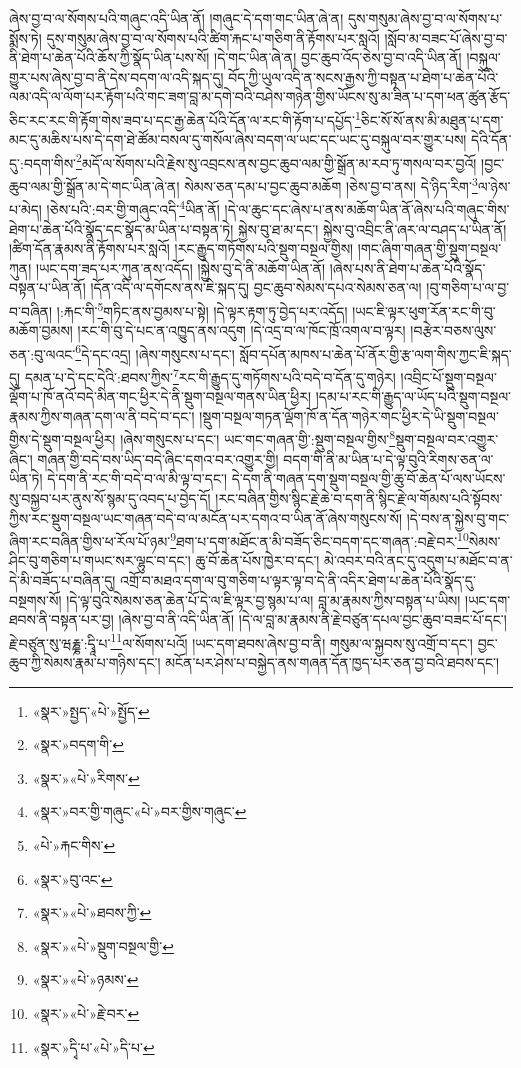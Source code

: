 ཞེས་བྱ་བ་ལ་སོགས་པའི་གཞུང་འདི་ཡིན་ནོ། །གཞུང་དེ་དག་གང་ཡིན་ཞེ་ན། དུས་གསུམ་ཞེས་བྱ་བ་ལ་སོགས་པ་སྨོས་ཏེ། དུས་གསུམ་ཞེས་བྱ་བ་ལ་སོགས་པའི་ཚིག་རྐང་པ་གཅིག་ནི་རྟོགས་པར་སླའོ། །སློབ་མ་བཟང་པོ་ཞེས་བྱ་བ་ནི་ཐེག་པ་ཆེན་པོའི་ཆོས་ཀྱི་སྣོད་ཡིན་པས་སོ། །དེ་གང་ཡིན་ཞེ་ན། བྱང་ཆུབ་འོད་ཅེས་བྱ་བ་འདི་ཡིན་ནོ། །བསྐུལ་གྱུར་པས་ཞེས་བྱ་བ་ནི་དེས་བདག་ལ་འདི་སྐད་དུ། བོད་ཀྱི་ཡུལ་འདི་ན་སངས་རྒྱས་ཀྱི་བསྟན་པ་ཐེག་པ་ཆེན་པོའི་ལམ་འདི་ལ་ལོག་པར་རྟོག་པའི་གང་ཟག་བླ་མ་དགེ་བའི་བཤེས་གཉེན་གྱིས་ཡོངས་སུ་མ་ཟིན་པ་དག་ཕན་ཚུན་རྩོད་ཅིང་རང་རང་གི་རྟོག་གེས་ཟབ་པ་དང་རྒྱ་ཆེན་པོའི་དོན་ལ་རང་གི་རྟོག་པ་དཔྱོད་\footnote{«སྣར་»སྤྱད་«པེ་»སྤྱོད་}ཅིང་སོ་སོ་ནས་མི་མཐུན་པ་དག་མང་དུ་མཆིས་པས་དེ་དག་ཐེ་ཚོམ་བསལ་དུ་གསོལ་ཞེས་བདག་ལ་ཡང་དང་ཡང་དུ་བསྐུལ་བར་གྱུར་པས། དེའི་དོན་དུ་:བདག་གིས་\footnote{«སྣར་»བདག་གི་}མདོ་ལ་སོགས་པའི་རྗེས་སུ་འབྲངས་ནས་བྱང་ཆུབ་ལམ་གྱི་སྒྲོན་མ་རབ་ཏུ་གསལ་བར་བྱའོ། །བྱང་ཆུབ་ལམ་གྱི་སྒྲོན་མ་དེ་གང་ཡིན་ཞེ་ན། སེམས་ཅན་དམ་པ་བྱང་ཆུབ་མཆོག །ཅེས་བྱ་བ་ནས། དེ་ཉིད་རིག་\footnote{«སྣར་»«པེ་»རིགས་}ལ་ཉེས་པ་མེད། །ཅེས་པའི་:བར་གྱི་གཞུང་འདི་\footnote{«སྣར་»བར་གྱི་གཞུང་«པེ་»བར་གྱིས་གཞུང་}ཡིན་ནོ། །དེ་ལ་ཆུང་དང་ཞེས་པ་ནས་མཆོག་ཡིན་ནོ་ཞེས་པའི་གཞུང་གིས་ཐེག་པ་ཆེན་པོའི་སྣོད་དང་སྣོད་མ་ཡིན་པ་བསྟན་ཏེ། སྐྱེས་བུ་ཐ་མ་དང་། སྐྱེས་བུ་འབྲིང་ནི་ཞར་ལ་བཤད་པ་ཡིན་ནོ། །ཚིག་དོན་རྣམས་ནི་རྟོགས་པར་སླའོ། །རང་རྒྱུད་གཏོགས་པའི་སྡུག་བསྔལ་གྱིས། །གང་ཞིག་གཞན་གྱི་སྡུག་བསྔལ་ཀུན། །ཡང་དག་ཟད་པར་ཀུན་ནས་འདོད། །སྐྱེས་བུ་དེ་ནི་མཆོག་ཡིན་ནོ། །ཞེས་པས་ནི་ཐེག་པ་ཆེན་པོའི་སྣོད་བསྟན་པ་ཡིན་ནོ། །དོན་འདི་ལ་དགོངས་ནས་ཇི་སྐད་དུ། བྱང་ཆུབ་སེམས་དཔའ་སེམས་ཅན་ལ། །བུ་གཅིག་པ་ལ་བྱ་བ་བཞིན། །:རྐང་གི་\footnote{«པེ་»རྐང་གིས་}གཏིང་ནས་བྱམས་པ་སྟེ། །དེ་ལྟར་རྟག་ཏུ་བྱེད་པར་འདོད། །ཡང་ཇི་ལྟར་ཕུག་རོན་རང་གི་བུ་མཆོག་བྱམས། །རང་གི་བུ་དེ་པང་ན་འཁྱུད་ནས་འདུག །དེ་འདྲ་བ་ལ་ཁོང་ཁྲོ་འགལ་བ་ལྟར། །བརྩེར་བཅས་ལུས་ཅན་:བུ་ལའང་\footnote{«སྣར་»བུ་འང་}དེ་དང་འདྲ། །ཞེས་གསུངས་པ་དང་། སློབ་དཔོན་མཁས་པ་ཆེན་པོ་ནོར་གྱི་རྩ་ལག་གིས་ཀྱང་ཇི་སྐད་དུ། དམན་པ་དེ་དང་དེའི་:ཐབས་ཀྱིས་\footnote{«སྣར་»«པེ་»ཐབས་ཀྱི་}རང་གི་རྒྱུད་དུ་གཏོགས་པའི་བདེ་བ་དོན་དུ་གཉེར། །འབྲིང་པོ་སྡུག་བསྔལ་ལྡོག་པ་ཁོ་ནའོ་བདེ་མིན་གང་ཕྱིར་དེ་ནི་སྡུག་བསྔལ་གནས་ཡིན་ཕྱིར། །དམ་པ་རང་གི་རྒྱུད་ལ་ཡོད་པའི་སྡུག་བསྔལ་རྣམས་ཀྱིས་གཞན་དག་ལ་ནི་བདེ་བ་དང་། །སྡུག་བསྔལ་གཏན་ལྡོག་ཁོ་ན་དོན་གཉེར་གང་ཕྱིར་དེ་ཡི་སྡུག་བསྔལ་གྱིས་དེ་སྡུག་བསྔལ་ཕྱིར། །ཞེས་གསུངས་པ་དང་། ཡང་གང་གཞན་གྱི་:སྡུག་བསྔལ་གྱིས་\footnote{«སྣར་»«པེ་»སྡུག་བསྔལ་གྱི་}སྡུག་བསྔལ་བར་འགྱུར་ཞིང་། གཞན་གྱི་བདེ་བས་ཡིད་བདེ་ཞིང་དགའ་བར་འགྱུར་གྱི། བདག་གི་ནི་མ་ཡིན་པ་དེ་ལྟ་བུའི་རིགས་ཅན་ལ་ཡིན་ཏེ། དེ་དག་ནི་རང་གི་བདེ་བ་ལ་མི་ལྟ་བ་དང་། དེ་དག་ནི་གཞན་དག་སྡུག་བསྔལ་གྱི་ཆུ་བོ་ཆེན་པོ་ལས་ཡོངས་སུ་བསྐྱབ་པར་ནུས་སོ་སྙམ་དུ་འབད་པ་བྱེད་དོ། །རང་བཞིན་གྱིས་སྙིང་རྗེ་ཆེ་བ་དག་ནི་སྙིང་རྗེ་ལ་གོམས་པའི་སྟོབས་ཀྱིས་རང་སྡུག་བསྔལ་ཡང་གཞན་བདེ་བ་ལ་མངོན་པར་དགའ་བ་ཡིན་ནོ་ཞེས་གསུངས་སོ། །དེ་བས་ན་སྐྱེས་བུ་གང་ཞིག་རང་བཞིན་གྱིས་ཕ་རོལ་པོ་ཉམ་\footnote{«སྣར་»«པེ་»ཉམས་}ཐག་པ་དག་མཐོང་ན་མི་བཟོད་ཅིང་བདག་དང་གཞན་:བརྗེ་བར་\footnote{«སྣར་»«པེ་»རྗེ་བར་}སེམས་ཤིང་བུ་གཅིག་པ་གཡང་སར་ལྷུང་བ་དང་། ཆུ་བོ་ཆེན་པོས་ཁྱེར་བ་དང་། མེ་འབར་བའི་ནང་དུ་འདུག་པ་མཐོང་བ་ན་དེ་མི་བཟོད་པ་བཞིན་དུ། འགྲོ་བ་མཐའ་དག་ལ་བུ་གཅིག་པ་ལྟར་ལྟ་བ་དེ་ནི་འདིར་ཐེག་པ་ཆེན་པོའི་སྣོད་དུ་བསྔགས་སོ། །དེ་ལྟ་བུའི་སེམས་ཅན་ཆེན་པོ་དེ་ལ་ཇི་ལྟར་བྱ་སྙམ་པ་ལ། བླ་མ་རྣམས་ཀྱིས་བསྟན་པ་ཡིས། །ཡང་དག་ཐབས་ནི་བསྟན་པར་བྱ། །ཞེས་བྱ་བ་ནི་འདི་ཡིན་ནོ། །དེ་ལ་བླ་མ་རྣམས་ནི་རྗེ་བཙུན་དཔལ་བྱང་ཆུབ་བཟང་པོ་དང་། རྗེ་བཙུན་སུ་ཝརྞྞ་:དྭཱི་པ་\footnote{«སྣར་»དྭི་པ་«པེ་»དི་པ་}ལ་སོགས་པའོ། །ཡང་དག་ཐབས་ཞེས་བྱ་བ་ནི། གསུམ་ལ་སྐྱབས་སུ་འགྲོ་བ་དང་། བྱང་ཆུབ་ཀྱི་སེམས་རྣམ་པ་གཉིས་དང་། མངོན་པར་ཤེས་པ་བསྐྱེད་ནས་གཞན་དོན་ཁྱད་པར་ཅན་བྱ་བའི་ཐབས་དང་། 